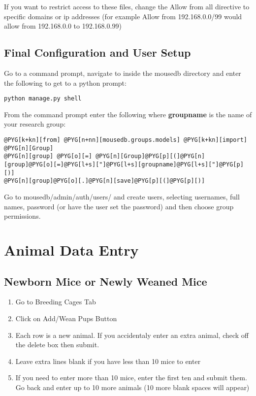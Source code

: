 \documentclass[letterpaper,10pt,english]{sphinxmanual}
\begin{document}
If you want to restrict access to these files, change the Allow from all directive to specific domains or ip addresses (for example Allow from 192.168.0.0/99 would allow from 192.168.0.0 to 192.168.0.99)


\section{Final Configuration and User Setup}

Go to a command prompt, navigate to inside the mousedb directory and enter the following to get to a python prompt:

\begin{Verbatim}[commandchars=@\[\]]
python manage.py shell
\end{Verbatim}

From the command prompt enter the following where \textbf{groupname} is the name of your research group:

\begin{Verbatim}[commandchars=@\[\]]
@PYG[k+kn][from] @PYG[n+nn][mousedb.groups.models] @PYG[k+kn][import] @PYG[n][Group]
@PYG[n][group] @PYG[o][=] @PYG[n][Group]@PYG[p][(]@PYG[n][group]@PYG[o][=]@PYG[l+s]["]@PYG[l+s][groupname]@PYG[l+s]["]@PYG[p][)]
@PYG[n][group]@PYG[o][.]@PYG[n][save]@PYG[p][(]@PYG[p][)]
\end{Verbatim}

Go to mousedb/admin/auth/users/ and create users, selecting usernames, full names, password (or have the user set the password) and then choose group permissions.

\resetcurrentobjects
\hypertarget{--doc-usage}{}

\chapter{Animal Data Entry}


\section{Newborn Mice or Newly Weaned Mice}
\begin{enumerate}
\item {} 
Go to Breeding Cages Tab

\item {} 
Click on Add/Wean Pups Button

\item {} 
Each row is a new animal.  If you accidentaly enter an extra animal, check off the delete box then submit.

\item {} 
Leave extra lines blank if you have less than 10 mice to enter

\item {} 
If you need to enter more than 10 mice, enter the first ten and submit them.  Go back and enter up to 10 more animals (10 more blank spaces will appear)

\end{enumerate}
\end{document}
